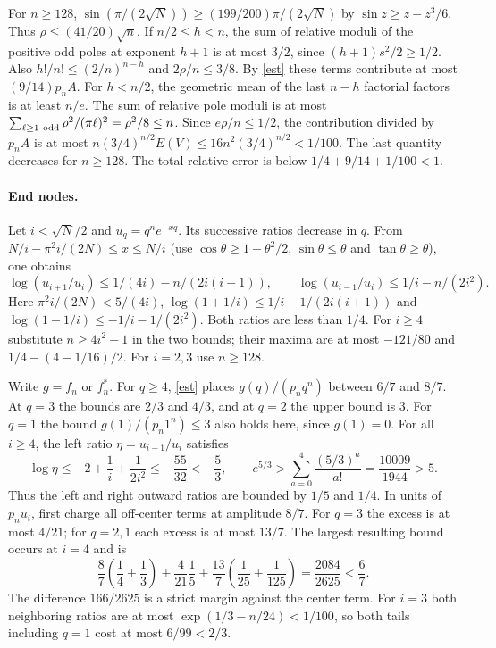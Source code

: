 \documentclass[11pt]{article}
\begin{document}
For $n\ge128$, $\sin(\pi/(2\sqrt N))\ge(199/200)\pi/(2\sqrt N)$ by $\sin z\ge z-z^3/6$. Thus $\rho\le(41/20)\sqrt n$. If $n/2\le h<n$, the sum of relative moduli of the positive odd poles at exponent $h+1$ is at most $3/2$, since $(h+1)s^2/2\ge1/2$. Also $h!/n!\le(2/n)^{n-h}$ and $2\rho/n\le3/8$. By \eqref{est} these terms contribute at most $(9/14)p_nA$. For $h<n/2$, the geometric mean of the last $n-h$ factorial factors is at least $n/e$. The sum of relative pole moduli is at most $\sum_{\ell\ge1\ {\rm odd}}\rho^2/(\pi\ell)^2=\rho^2/8\le n$. Since $e\rho/n\le1/2$, the contribution divided by $p_n A$ is at most
$n(3/4)^{n/2}E(V)\le16n^2(3/4)^{n/2}<1/100$. The last quantity decreases for $n\ge128$. The total relative error is below $1/4+9/14+1/100<1$.

\paragraph{End nodes.}
Let $i<\sqrt N/2$ and $u_q=q^n e^{-xq}$. Its successive ratios decrease in $q$. From
$N/i-\pi^2 i/(2N)\le x\le N/i$ (use $\cos\theta\ge1-\theta^2/2$, $\sin\theta\le\theta$ and $\tan\theta\ge\theta$), one obtains
\[
 \log(u_{i+1}/u_i)\le 1/(4i)-n/(2i(i+1)),\qquad
 \log(u_{i-1}/u_i)\le 1/i-n/(2i^2).
\]
Here $\pi^2 i/(2N)<5/(4i)$, $\log(1+1/i)\le1/i-1/(2i(i+1))$ and $\log(1-1/i)\le-1/i-1/(2i^2)$. Both ratios are less than $1/4$. For $i\ge4$ substitute $n\ge4i^2-1$ in the two bounds; their maxima are at most $-121/80$ and $1/4-(4-1/16)/2$. For $i=2,3$ use $n\ge128$.

Write $g=f_n$ or $f_n^*$. For $q\ge4$, \eqref{est} places $g(q)/(p_n q^n)$ between $6/7$ and $8/7$. At $q=3$ the bounds are $2/3$ and $4/3$, and at $q=2$ the upper bound is 3. For $q=1$ the bound $g(1)/(p_n1^n)\le3$ also holds here, since $g(1)=0$.
For all $i\ge4$, the left ratio $\eta=u_{i-1}/u_i$ satisfies
\[
 \log\eta\le-2+\frac1i+\frac1{2i^2}\le-\frac{55}{32}<-\frac53,\qquad
 e^{5/3}>\sum_{a=0}^4\frac{(5/3)^a}{a!}=\frac{10009}{1944}>5.
\]
Thus the left and right outward ratios are bounded by $1/5$ and $1/4$.
In units of $p_nu_i$, first charge all off-center terms at amplitude $8/7$.
For $q=3$ the excess is at most $4/21$; for $q=2,1$ each excess is at most $13/7$.
The largest resulting bound occurs at $i=4$ and is
\begin{equation}\label{tails}
 \frac87\left(\frac14+\frac13\right)
 +\frac4{21}\frac15+\frac{13}{7}\left(\frac1{25}+\frac1{125}\right)
 =\frac{2084}{2625}<\frac67 .
\end{equation}
The difference $166/2625$ is a strict margin against the center term.
For $i=3$ both neighboring ratios are at most $\exp(1/3-n/24)<1/100$,
so both tails including $q=1$ cost at most $6/99<2/3$.
\end{document}
